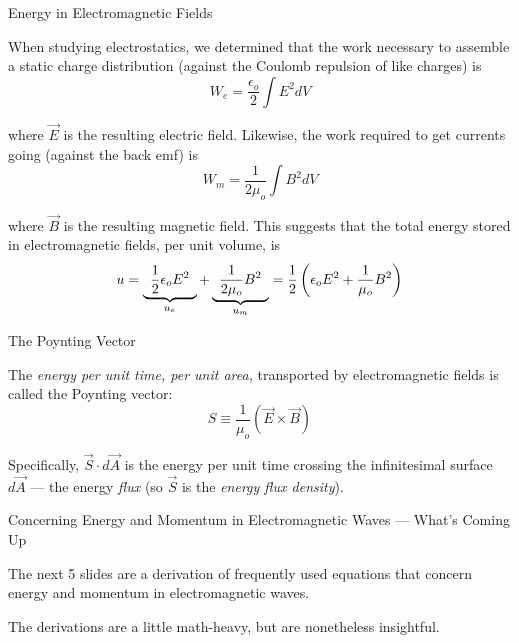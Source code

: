 \documentclass{beamer}
\begin{document}
\begin{frame}{Energy in Electromagnetic Fields}

When studying electrostatics, we determined that the work necessary to assemble a static charge distribution (against the Coulomb repulsion of like charges) is
\begin{equation*}
    W_e = \frac{\epsilon_o}{2} \int E^2 dV
\end{equation*}

where $\vec{E}$ is the resulting electric field. Likewise, the work required to get currents going (against the back emf) is
\begin{equation*}
    W_m = \frac{1}{2\mu_o} \int B^2 dV
\end{equation*}

where $\vec{B}$ is the resulting magnetic field. This suggests that the total energy stored in electromagnetic fields, per unit volume, is
\begin{equation*}
    u = \underbrace{\hspace{0.5em}\frac{1}{2}\epsilon_o E^2\hspace{0.5em}}_{u_e} + \underbrace{\hspace{0.5em}\frac{1}{2\mu_o} B^2\hspace{0.5em}}_{u_m} = \frac{1}{2} \left( \epsilon_o E^2 + \frac{1}{\mu_o} B^2 \right)
\end{equation*}

\end{frame}

\begin{frame}{The Poynting Vector}

The \emph{energy per unit time, per unit area,} transported by electromagnetic fields is called the Poynting vector:
\begin{equation*}
    S \equiv \frac{1}{\mu_o} \left( \vec{E} \times \vec{B} \right)
\end{equation*}

Specifically, $\vec{S} \cdot d\vec{A}$ is the energy per unit time crossing the infinitesimal surface $d\vec{A}$ --- the energy \emph{flux} (so $\vec{S}$ is the \emph{energy flux density}).

\end{frame}

\begin{frame}{Concerning Energy and Momentum in Electromagnetic Waves --- What's Coming Up}

The next 5 slides are a derivation of frequently used equations that concern energy and momentum in electromagnetic waves.

\vfill

The derivations are a little math-heavy, but are nonetheless insightful.

\end{frame}
\end{document}
